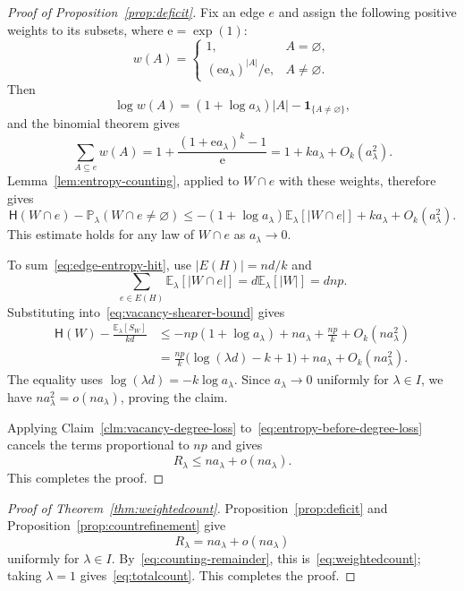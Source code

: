 \documentclass[11pt,reqno]{amsart}
\makeatletter
\numberwithin{equation}{section}
\theoremstyle{plain}
\newenvironment{claimproof}[1][Proof]{\par
    \pushQED{\qed}%
    \renewcommand{\qedsymbol}{$\blacksquare$}
    \normalfont \topsep6\p@\@plus6\p@\relax
    \trivlist
    \item[\hskip\labelsep
    \textit{#1}\@addpunct{.}~]\ignorespaces
}{%
    \popQED\endtrivlist\@endpefalse
}
\theoremstyle{definition}
\newcommand{\E}{\mathbb E}
\newcommand{\Prob}{\mathbb P}
\newcommand{\HH}{\mathsf H}
\makeatother
\begin{document}
\begin{proof}[Proof of Proposition~\ref{prop:deficit}]
\begin{claimproof}[Proof of Claim~\ref{clm:vacancy-degree-loss}]
        Fix an edge $e$ and assign the following positive weights to its subsets, where $\mathrm e=\exp(1)$:
        \[
            w(A)=
            \begin{cases}
                1,&A=\varnothing,\\
                (\mathrm e a_\lambda)^{|A|}/\mathrm e,&A\ne\varnothing.
            \end{cases}
        \]
        Then
        \[
            \log w(A)=(1+\log a_\lambda)|A|-\mathbf1_{\{A\ne\varnothing\}},
        \]
        and the binomial theorem gives
        \[
            \sum_{A\subseteq e}w(A)
            =1+\frac{(1+\mathrm e a_\lambda)^k-1}{\mathrm e}
            =1+ka_\lambda+O_k(a_\lambda^2).
        \]
        Lemma~\ref{lem:entropy-counting}, applied to $W\cap e$ with these weights, therefore gives
        \begin{equation}\label{eq:edge-entropy-hit}
            \HH(W\cap e)-\Prob_\lambda(W\cap e\ne\varnothing)
            \le-(1+\log a_\lambda)\E_\lambda[|W\cap e|]+ka_\lambda+O_k(a_\lambda^2).
        \end{equation}
        This estimate holds for any law of $W\cap e$ as $a_\lambda\to0$.

        To sum~\eqref{eq:edge-entropy-hit}, use $|E(H)|=nd/k$ and
        \[
            \sum_{e\in E(H)}\E_\lambda[|W\cap e|]=d\E_\lambda[|W|]=dnp.
        \]
        Substituting into~\eqref{eq:vacancy-shearer-bound} gives
        \[
            \begin{aligned}
                \HH(W)-\frac{\E_\lambda[S_W]}{kd}
                &\le-np(1+\log a_\lambda)+na_\lambda+\frac{np}{k}+O_k(na_\lambda^2)\\
                &=\frac{np}{k}\bigl(\log(\lambda d)-k+1\bigr)+na_\lambda+O_k(na_\lambda^2).
            \end{aligned}
        \]
        The equality uses $\log(\lambda d)=-k\log a_\lambda$.
        Since $a_\lambda\to0$ uniformly for $\lambda\in I$, we have $na_\lambda^2=o(na_\lambda)$, proving the claim.
    \end{claimproof}

    Applying Claim~\ref{clm:vacancy-degree-loss} to~\eqref{eq:entropy-before-degree-loss} cancels the terms proportional to $np$ and gives
    \[
        R_\lambda\le na_\lambda+o(na_\lambda).
    \]
    This completes the proof.
\end{proof}

\begin{proof}[Proof of Theorem~\ref{thm:weightedcount}]
    Proposition~\ref{prop:deficit} and Proposition~\ref{prop:countrefinement} give
    \[
        R_\lambda=na_\lambda+o(na_\lambda)
    \]
    uniformly for $\lambda\in I$.
    By~\eqref{eq:counting-remainder}, this is~\eqref{eq:weightedcount}; taking $\lambda=1$ gives~\eqref{eq:totalcount}.
    This completes the proof.
\end{proof}
\end{document}
